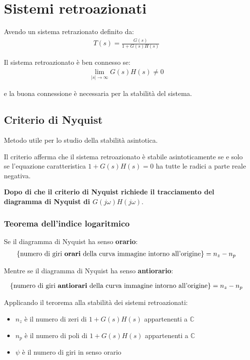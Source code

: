 \chapter{Sistemi retroazionati}
Avendo un sistema retrazionato definito da:
\begin{align}
  T(s) = \frac{G(s)}{1+G(s)H(s)}
\end{align}

Il sistema retroazionato \`e ben connesso se:
\begin{align}
  \lim_{|s| \to \infty} G(s)H(s) \neq 0
\end{align}

e la buona connessione \`e necessaria per la stabilit\`a del sistema.



\section{Criterio di Nyquist}
Metodo utile per lo studio della stabilit\`a asintotica.

Il criterio afferma che il sistema retroazionato \`e stabile asintoticamente
se e solo se l'equazione caratteristica $1 + G(s)H(s) = 0$ ha tutte le radici a parte reale 
negativa.

\textbf{Dopo di che il criterio di Nyquist richiede il tracciamento del diagramma di Nyquist di $G(j\omega)H(j\omega)$}.





\subsection{Teorema dell'indice logaritmico}

Se il diagramma di Nyquist ha senso \textbf{orario}:
\begin{align}
  \{\text{numero di giri \textbf{orari} della curva immagine intorno all'origine}\} = n_z - n_p
\end{align}


Mentre se il diagramma di Nyquist ha senso \textbf{antiorario}:

\begin{align}
  \{\text{numero di giri \textbf{antiorari} della curva immagine intorno all'origine}\} = n_z - n_p
\end{align}


Applicando il terorema alla stabilit\`a dei sistemi retroazionati:
\begin{itemize}
  \item $n_z$ \`e il numero di zeri di $1 + G(s)H(s)$ appartenenti a $\mathbb{C}$
  \item $n_p$ \`e il numero di poli di $1 + G(s)H(s)$ appartenenti a $\mathbb{C}$
  \item $\psi$ \`e il numero di giri in senso orario
\end{itemize}

